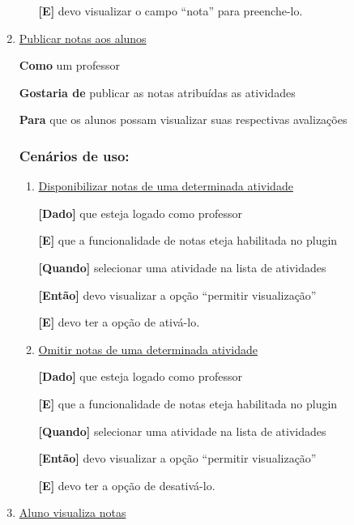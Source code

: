 \begin{enumerate}
\begin{enumerate}
\textbf{[E]} devo visualizar o campo ``nota'' para preenche-lo.

\end{enumerate}


\item \underline{Publicar notas aos alunos}

\textbf{Como} um professor

\textbf{Gostaria de} publicar as notas atribuídas as atividades

\textbf{Para} que os alunos possam visualizar suas respectivas avalizações

\subsubsection*{Cenários de uso:}

\begin{enumerate}
\item \underline{Disponibilizar notas de uma determinada atividade}

\textbf{[Dado]} que esteja logado como professor

\textbf{[E]} que a funcionalidade de notas eteja habilitada no plugin

\textbf{[Quando]} selecionar uma atividade na lista de atividades

\textbf{[Então]} devo visualizar a opção ``permitir visualização''

\textbf{[E]} devo ter a opção de ativá-lo.

\item \underline{Omitir notas de uma determinada atividade}

\textbf{[Dado]} que esteja logado como professor

\textbf{[E]} que a funcionalidade de notas eteja habilitada no plugin

\textbf{[Quando]} selecionar uma atividade na lista de atividades

\textbf{[Então]} devo visualizar a opção ``permitir visualização''

\textbf{[E]} devo ter a opção de desativá-lo.

\end{enumerate}

\item \underline{Aluno visualiza notas}


\end{enumerate}
